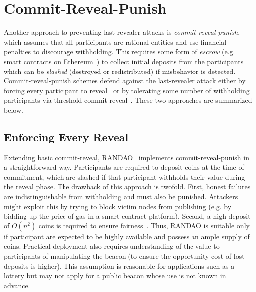 
\section{Commit-Reveal-Punish}
\label{section:commit-reveal-punish}
Another approach to preventing last-revealer attacks is \textit{commit-reveal-punish}, which assumes that all participants are rational entities and use financial penalties to discourage withholding. This requires some form of \textit{escrow} (e.g. smart contracts on Ethereum~\cite{wood2014ethereum}) to collect initial deposits from the participants which can be \emph{slashed} (destroyed or redistributed) if misbehavior is detected. Commit-reveal-punish schemes defend against the last-revealer attack either by forcing every participant to reveal~\cite{youcai2017randao, andrychowicz2014secure, bentov2014use} or by tolerating some number of withholding participants via threshold commit-reveal~\cite{david2020economically}. These two approaches are summarized below.

\subsection{Enforcing Every Reveal}
Extending basic commit-reveal, RANDAO~\cite{youcai2017randao} implements commit-reveal-punish in a straightforward way. Participants are required to deposit coins at the time of commitment, which are slashed if that participant withholds their value during the reveal phase. 
The drawback of this approach is twofold. First, honest failures are indistinguishable from withholding and must also be punished. Attackers might exploit this by trying to block victim nodes from publishing (e.g. by bidding up the price of gas in a smart contract platform). Second, a high deposit of $O(n^2)$ coins is required to ensure fairness~\cite{andrychowicz2014secure,bentov2014use}. Thus, RANDAO is suitable only if participant are expected to be highly available and possess an ample supply of coins.
Practical deployment also requires understanding of the value to participants of manipulating the beacon (to ensure the opportunity cost of lost deposits is higher). This assumption is reasonable for applications such as a lottery but may not apply for a public beacon whose use is not known in advance.



